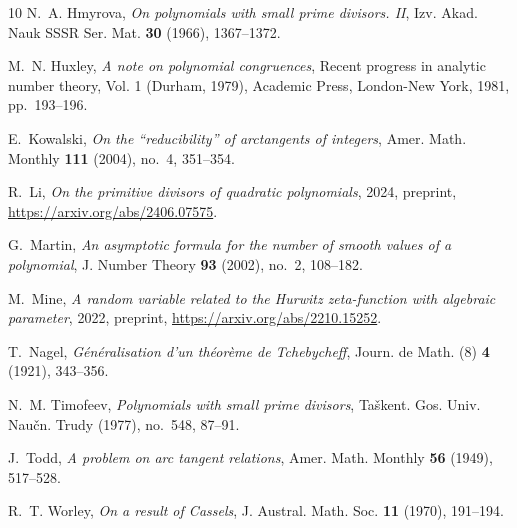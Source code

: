 \documentclass[a4paper,11pt]{amsart}
\theoremstyle{definition}
\numberwithin{equation}{section}
\begin{document}
\begin{thebibliography}{10}
N.~A. Hmyrova, \emph{On polynomials with small prime divisors. {II}}, Izv.
  Akad. Nauk SSSR Ser. Mat. \textbf{30} (1966), 1367--1372. 

M.~N. Huxley, \emph{A note on polynomial congruences}, Recent progress in
  analytic number theory, {V}ol. 1 ({D}urham, 1979), Academic Press, London-New
  York, 1981, pp.~193--196. 

E.~Kowalski, \emph{On the ``reducibility'' of arctangents of integers}, Amer.
  Math. Monthly \textbf{111} (2004), no.~4, 351--354. 

R.~Li, \emph{On the primitive divisors of quadratic polynomials}, 2024,
  preprint, \url{https://arxiv.org/abs/2406.07575}.

G.~Martin, \emph{An asymptotic formula for the number of smooth values of a
  polynomial}, J. Number Theory \textbf{93} (2002), no.~2, 108--182.

M.~Mine, \emph{A random variable related to the {H}urwitz zeta-function with
  algebraic parameter}, 2022, preprint, \url{https://arxiv.org/abs/2210.15252}.

T.~Nagel, \emph{G{\'e}n{\'e}ralisation d'un th{\'e}or{\`e}me de {T}chebycheff},
  Journ. de Math. (8) \textbf{4} (1921), 343--356.

N.~M. Timofeev, \emph{Polynomials with small prime divisors}, Ta\v skent. Gos.
  Univ. Nau\v cn. Trudy (1977), no.~548, 87--91. 

J.~Todd, \emph{A problem on arc tangent relations}, Amer. Math. Monthly
  \textbf{56} (1949), 517--528. 

R.~T. Worley, \emph{On a result of {C}assels}, J. Austral. Math. Soc.
  \textbf{11} (1970), 191--194. 

\end{thebibliography}
\end{document}
